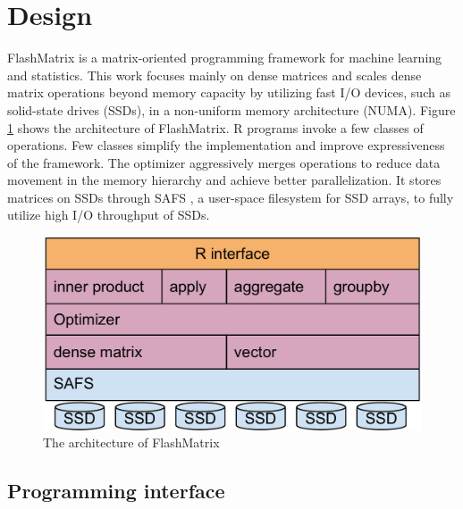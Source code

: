 \vspace{-10pt}
\section{Design}
\vspace{-5pt}

FlashMatrix is a matrix-oriented programming framework for machine learning and
statistics.
This work focuses mainly on dense matrices and scales dense matrix operations
beyond memory capacity by utilizing fast I/O devices, such as solid-state drives
(SSDs), in a non-uniform memory architecture (NUMA).
Figure \ref{fig:arch} shows the architecture of FlashMatrix. 
R programs invoke a few classes of operations.  Few classes
simplify the implementation and improve expressiveness of
the framework. 
The optimizer aggressively merges operations to
reduce data movement in the memory hierarchy and achieve better parallelization.
It stores matrices on SSDs through SAFS \cite{safs},
a user-space filesystem for SSD arrays, to fully utilize high I/O
throughput of SSDs.

\begin{figure}
\centering
\includegraphics[scale=0.3]{FlashMatrix_figs/architecture.pdf}
\vspace{-2pt}
\caption{The architecture of FlashMatrix}
\label{fig:arch}
\end{figure}

\vspace{-8pt}
\subsection{Programming interface}
\vspace{-4pt}

